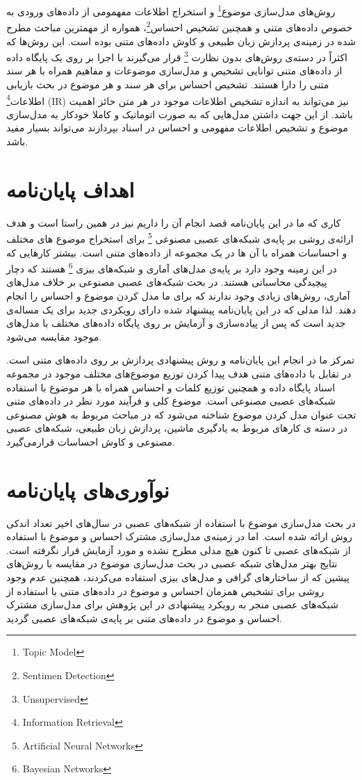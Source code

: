  		روش‌های مدل‌سازی موضوع\footnote{Topic Model}
 		و استخراج اطلاعات مفهمومی از داده‌های ورودی به خصوص داده‌های متنی و همچنین تشخیص احساس\footnote{Sentimen Detection}،
 		 همواره از مهمترین مباحث مطرح شده در زمینه‌ی پردازش زبان طبیعی و کاوش داده‌های متنی بوده است. این روش‌ها که اکثراً در دسته‌ی روش‌های بدون نظارت \footnote{Unsupervised}
 		 قرار می‌‌گیرند با اجرا بر روی یک پایگاه داده‌ از داده‌های متنی توانایی تشخیص و مدل‌سازی موضوعات و مفاهیم همراه با هر سند متنی را دارا هستند. تشخیص احساس برای هر سند و هر موضوع در بحث بازیابی اطلاعات\footnote{Information Retrieval}
 (IR)
 		 نیز می‌‌تواند به اندازه تشخیص اطلاعات موجود در هر متن حائز اهمیت باشد. از این جهت داشتن مدل‌هایی که به صورت اتوماتیک و کاملا خودکار به مدل‌سازی موضوع و تشخیص اطلاعات مفهومی‌ و احساس در اسناد بپردازند می‌تواند بسیار مفید باشد.
 		
\section{اهداف پایان‌نامه}
کاری که ما در این پایان‌‌نامه قصد انجام آن را داریم نیز در همین راستا است و هدف ارائه‌ی روشی‌ بر پایه‌ی شبکه‌های عصبی مصنوعی \footnote{Artificial Neural Networks}
برای استخراج موضوع های مختلف و احساسا‌ت همراه  با آن ها در یک مجموعه از داده‌های متنی است. بیشتر کارهایی که در این زمینه وجود دارد بر پایه‌ی مدل‌های آماری و شبکه‌های بیزی \footnote{Bayesian Networks}
هستند که دچار پیچیدگی محاسباتی هستند. در بحث شبکه‌های عصبی مصنوعی بر خلاف مدل‌های آماری، روش‌های زیادی وجود ندارند که برای ما مدل کردن موضوع و احساس را انجام دهند. لذا مدلی‌ که در این پایان‌‌نامه پیشنهاد شده دارای رویکردی جدید برای یک مساله‌ی جدید است که پس از پیاده‌سازی و آزمایش بر روی پایگاه داده‌های مختلف با مدل‌های موجود مقایسه می‌‌شود.


تمرکز ما در انجام این پایان‌‌نامه و روش پیشنهادی پردازش بر روی داده‌های متنی است. در تقابل با داده‌های متنی هدف پیدا کردن توزیع موضوع‌های مختلف موجود در مجموعه اسناد پایگاه داده و همچنین توزیع کلمات و احساس همراه با هر موضوع با استفاده شبکه‌های عصبی مصنوعی است. موضوع کلی و فرآیند مورد نظر در داده‌های متنی تحت عنوان مدل کردن موضوع شناخته می‌‌شود که در مباحث مربوط به هوش مصنوعی در دسته ی کارهای مربوط به یادگیری ماشین، پردازش زبان طبیعی، شبکه‌های عصبی مصنوعی و کاوش احساسات قرارمی‌‌گیرد.

\section{نوآوری‌های پایان‌نامه}
در بحث مدل‌سازی موضوع با استفاده از شبکه‌های عصبی در سال‌های اخیر تعداد اندکی‌ روش ارائه شده است. اما در زمینه‌‌ی مدل‌سازی مشترک احساس و موضوع با استفاده از شبکه‌های عصبی تا کنون هیچ مدلی‌ مطرح نشده و مورد آزمایش قرار نگرفته است. نتایج بهتر مدل‌های شبکه عصبی در بحث مدل‌سازی موضوع در مقایسه با روش‌های پیشین که از ساختارهای گرافی‌ و مدل‌های بیزی استفاده می‌‌کردند، همچنین عدم وجود روشی‌ برای تشخیص همزمان احساس و موضوع در داده‌های متنی با استفاده از شبکه‌های عصبی منجر به رویکرد پیشنهادی در این پژوهش برای مدل‌سازی مشترک احساس و موضوع در داده‌های متنی بر پایه‌ی شبکه‌های عصبی گردید.

